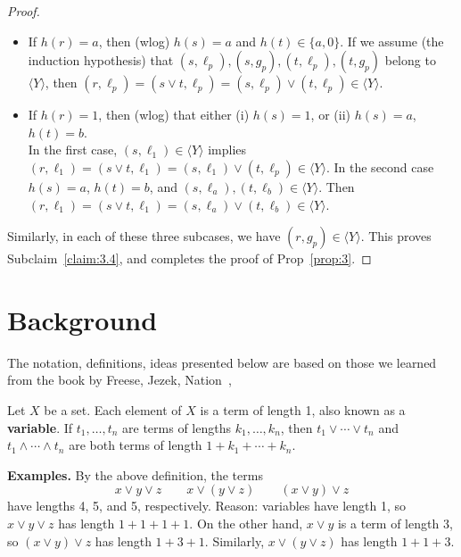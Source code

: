 \begin{proof}
\begin{itemize}
  \item If $h(r) = a$, then (wlog) $h(s) = a$ and $h(t) \in \{a, 0\}$.  If we assume (the induction hypothesis) that $(s, \ell_p), (s, g_p), (t, \ell_p), (t, g_p)$ belong to $\langle Y \rangle$, then $(r, \ell_p) = (s \vee t, \ell_p) =  (s, \ell_p) \vee (t, \ell_p) \in \langle Y \rangle$. 

  \item If $h(r) = 1$, then (wlog) that either (i) $h(s) = 1$, or (ii) $h(s) = a$, $h(t)=b$.\\
  In the first case, $(s, \ell_1) \in \langle Y \rangle$ implies 
  $(r, \ell_1) = (s \vee t, \ell_1) =  (s, \ell_1) \vee (t, \ell_p) \in \langle Y \rangle$.
  In the second case $h(s) = a$, $h(t) = b$, and
  $(s, \ell_a), (t, \ell_b) \in \langle Y \rangle$. Then
  $(r, \ell_1) = (s \vee t, \ell_1) =  (s, \ell_a) \vee (t, \ell_b) \in \langle Y \rangle$.

  \end{itemize}
Similarly, in each of these three subcases, we have $(r, g_p) \in \langle Y \rangle$.
This proves Subclaim~\ref{claim:3.4}, and completes the proof of Prop~\ref{prop:3}.
\end{proof}

\bigskip

\section{Background}
The notation, definitions, ideas presented below are based on those 
we learned from the book by Freese, Jezek, Nation~\cite{MR1319815}, 


\begin{definition} Let $X$ be a set. Each element of $X$ is a 
  term of length 1, also known as a \textbf{variable}. 
  If $t_1, \dots, t_n$ are terms of lengths $k_1, \dots, k_n$, 
  then $t_1 \vee \cdots \vee t_n$ and $t_1 \wedge \cdots \wedge t_n$ are 
  both terms of length $1+ k_1 + \cdots + k_n$.
\end{definition}

\noindent \textbf{Examples.} By the above definition, the terms 
\[x \vee y \vee z \qquad x \vee (y \vee z) \qquad (x \vee y) \vee z\]
have lengths 4, 5, and 5, respectively. Reason: variables have length 1, 
so $x \vee y \vee z$ has length $1 + 1 + 1 + 1$.  On the other hand, 
$x\vee y$ is a term of length $3$, so $(x \vee y) \vee z$ has length 
$1 + 3 + 1$. Similarly, $x \vee (y \vee z)$ has length $1 + 1 + 3$.

